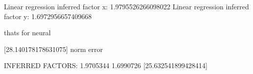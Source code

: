 Linear regression inferred factor x: 1.9795526266098022
Linear regression inferred factor y: 1.6972956657409668

thats for neural

[28.140178178631075] norm error




INFERRED FACTORS: 1.9705344 1.6990726
[25.632541899428414]